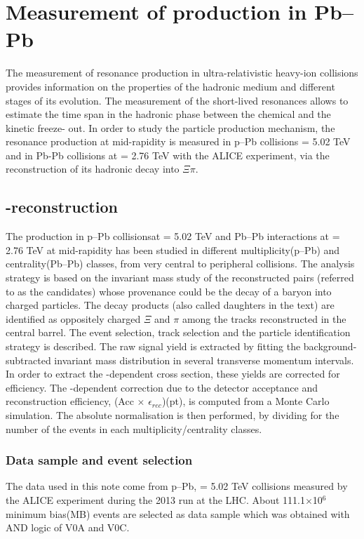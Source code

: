 \section{Measurement of \xis production in Pb--Pb}
The measurement of resonance production in ultra-relativistic heavy-ion collisions provides information on the properties of the hadronic medium and different stages of its evolution. The measurement of the short-lived resonances allows to estimate the time span in the hadronic phase between the chemical and the kinetic freeze- out. 
In order to study the particle production mechanism, the \xis resonance production at mid-rapidity is measured in p--Pb collisions \snn = 5.02  TeV and in Pb-Pb collisions at \snn = 2.76 TeV with the ALICE experiment, via the reconstruction of its hadronic decay into $\Xi\pi$.

\subsection{\xis-reconstruction}
The \xiss production in p--Pb collisionsat \snn = 5.02 TeV and Pb--Pb interactions at \snn = 2.76 TeV at mid-rapidity has been studied in different multiplicity(p--Pb) and centrality(Pb--Pb) classes, from very central to peripheral collisions. The analysis strategy is based on the invariant mass study of the reconstructed pairs (referred to as the candidates) whose provenance could be the decay of a \xiss baryon into charged particles. The decay products (also called daughters in the text) are identified as oppositely charged $\Xi$ and $\pi$ among the tracks reconstructed in the central barrel. The event selection, track selection and the particle identification strategy is described. The raw signal yield is extracted by fitting the background-subtracted invariant mass distribution in several transverse momentum intervals. In order to extract the \pt-dependent cross section, these yields are corrected for efficiency. The \pt-dependent correction due to the detector acceptance and reconstruction efficiency, (Acc $\times$ $\epsilon_{rec}$)(pt), is computed from a Monte Carlo simulation. The absolute normalisation is then performed, by dividing for the number of the events in each multiplicity/centrality classes.


\subsubsection{Data sample and event selection}
The data used in this note come from p--Pb, \snn = 5.02 TeV collisions measured by the ALICE experiment during the 2013 run at the LHC. About 111.1$\times$10$^{6}$ minimum bias(MB) events are selected as data sample which was obtained with AND logic of V0A and V0C. 

